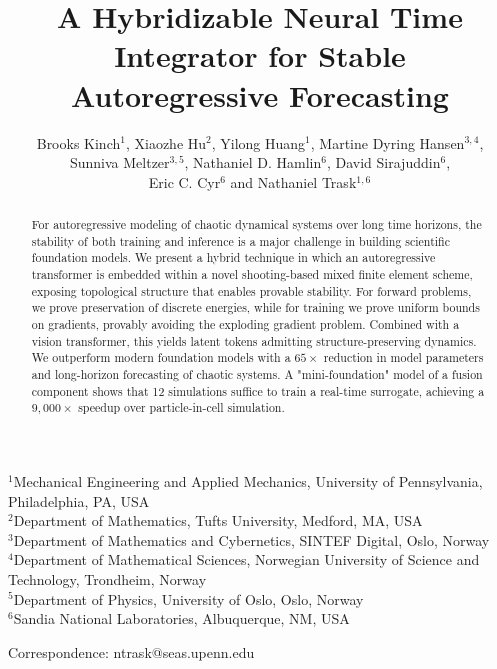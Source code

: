 \documentclass[12pt]{article}
\begin{document}
\title{A Hybridizable Neural Time Integrator for Stable Autoregressive Forecasting}

\author{\normalsize Brooks Kinch$^{1}$, Xiaozhe Hu$^{2}$, Yilong Huang$^{1}$, Martine Dyring Hansen$^{3, 4}$,\\
\normalsize Sunniva Meltzer$^{3, 5}$, Nathaniel D. Hamlin$^{6}$, David Sirajuddin$^{6}$,\\
\normalsize Eric C. Cyr$^{6}$ and Nathaniel Trask$^{1,6}$}

\date{}

\maketitle

\noindent
$^{1}$Mechanical Engineering and Applied Mechanics, University of Pennsylvania, Philadelphia, PA, USA\\
$^{2}$Department of Mathematics, Tufts University, Medford, MA, USA\\
$^{3}$Department of Mathematics and Cybernetics, SINTEF Digital, Oslo, Norway\\
$^{4}$Department of Mathematical Sciences, Norwegian University of Science and Technology, Trondheim, Norway \\
$^{5}$Department of Physics, University of Oslo, Oslo, Norway\\
$^{6}$Sandia National Laboratories, Albuquerque, NM, USA

\noindent
Correspondence: ntrask@seas.upenn.edu

\begin{abstract}

For autoregressive modeling of chaotic dynamical systems over long time horizons, the stability of both training and inference is a major challenge in building scientific foundation models. We present a hybrid technique in which an autoregressive transformer is embedded within a novel shooting-based mixed finite element scheme, exposing topological structure that enables provable stability. For forward problems, we prove preservation of discrete energies, while for training we prove uniform bounds on gradients, provably avoiding the exploding gradient problem. Combined with a vision transformer, this yields latent tokens admitting structure-preserving dynamics. We outperform modern foundation models with a $65\times$ reduction in model parameters and long-horizon forecasting of chaotic systems. A "mini-foundation" model of a fusion component shows that {12} simulations suffice to train a real-time surrogate, achieving a $9{,}000\times$ speedup over particle-in-cell simulation.
\end{abstract}
\end{document}
